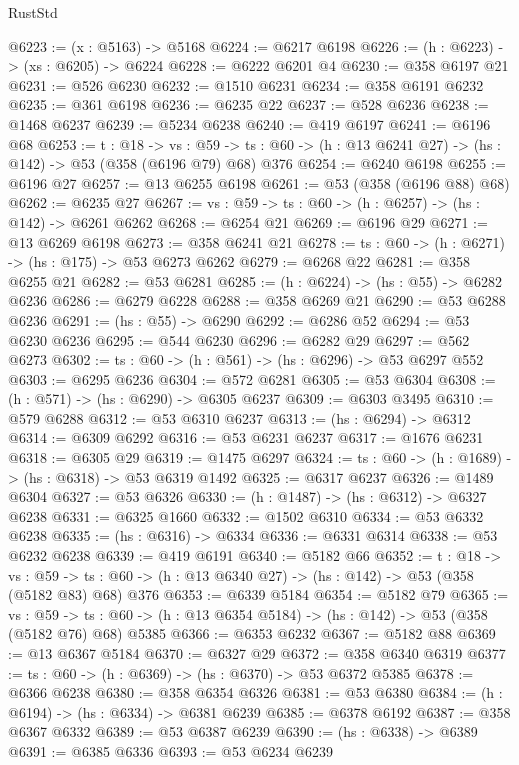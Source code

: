 \begin{lexlean}{RustStd}
\begin{coremodule}
@6223 := (x : @5163) -> @5168
@6224 := @6217 @6198
@6226 := (h : @6223) -> (xs : @6205) -> @6224
@6228 := @6222 @6201 @4
@6230 := @358 @6197 @21
@6231 := @526 @6230
@6232 := @1510 @6231
@6234 := @358 @6191 @6232
@6235 := @361 @6198
@6236 := @6235 @22
@6237 := @528 @6236
@6238 := @1468 @6237
@6239 := @5234 @6238
@6240 := @419 @6197
@6241 := @6196 @68
@6253 := {t : @18} ->
  {vs : @59} -> {ts : @60} -> (h : @13 @6241 @27) -> (hs : @142) -> @53 (@358 (@6196 @79) @68) @376
@6254 := @6240 @6198
@6255 := @6196 @27
@6257 := @13 @6255 @6198
@6261 := @53 (@358 (@6196 @88) @68)
@6262 := @6235 @27
@6267 := {vs : @59} -> {ts : @60} -> (h : @6257) -> (hs : @142) -> @6261 @6262
@6268 := @6254 @21
@6269 := @6196 @29
@6271 := @13 @6269 @6198
@6273 := @358 @6241 @21
@6278 := {ts : @60} -> (h : @6271) -> (hs : @175) -> @53 @6273 @6262
@6279 := @6268 @22
@6281 := @358 @6255 @21
@6282 := @53 @6281
@6285 := (h : @6224) -> (hs : @55) -> @6282 @6236
@6286 := @6279 @6228
@6288 := @358 @6269 @21
@6290 := @53 @6288 @6236
@6291 := (hs : @55) -> @6290
@6292 := @6286 @52
@6294 := @53 @6230 @6236
@6295 := @544 @6230
@6296 := @6282 @29
@6297 := @562 @6273
@6302 := {ts : @60} -> (h : @561) -> (hs : @6296) -> @53 @6297 @552
@6303 := @6295 @6236
@6304 := @572 @6281
@6305 := @53 @6304
@6308 := (h : @571) -> (hs : @6290) -> @6305 @6237
@6309 := @6303 @3495
@6310 := @579 @6288
@6312 := @53 @6310 @6237
@6313 := (hs : @6294) -> @6312
@6314 := @6309 @6292
@6316 := @53 @6231 @6237
@6317 := @1676 @6231
@6318 := @6305 @29
@6319 := @1475 @6297
@6324 := {ts : @60} -> (h : @1689) -> (hs : @6318) -> @53 @6319 @1492
@6325 := @6317 @6237
@6326 := @1489 @6304
@6327 := @53 @6326
@6330 := (h : @1487) -> (hs : @6312) -> @6327 @6238
@6331 := @6325 @1660
@6332 := @1502 @6310
@6334 := @53 @6332 @6238
@6335 := (hs : @6316) -> @6334
@6336 := @6331 @6314
@6338 := @53 @6232 @6238
@6339 := @419 @6191
@6340 := @5182 @66
@6352 := {t : @18} ->
  {vs : @59} -> {ts : @60} -> (h : @13 @6340 @27) -> (hs : @142) -> @53 (@358 (@5182 @83) @68) @376
@6353 := @6339 @5184
@6354 := @5182 @79
@6365 := {vs : @59} ->
  {ts : @60} -> (h : @13 @6354 @5184) -> (hs : @142) -> @53 (@358 (@5182 @76) @68) @5385
@6366 := @6353 @6232
@6367 := @5182 @88
@6369 := @13 @6367 @5184
@6370 := @6327 @29
@6372 := @358 @6340 @6319
@6377 := {ts : @60} -> (h : @6369) -> (hs : @6370) -> @53 @6372 @5385
@6378 := @6366 @6238
@6380 := @358 @6354 @6326
@6381 := @53 @6380
@6384 := (h : @6194) -> (hs : @6334) -> @6381 @6239
@6385 := @6378 @6192
@6387 := @358 @6367 @6332
@6389 := @53 @6387 @6239
@6390 := (hs : @6338) -> @6389
@6391 := @6385 @6336
@6393 := @53 @6234 @6239

\end{coremodule}
\end{lexlean}
